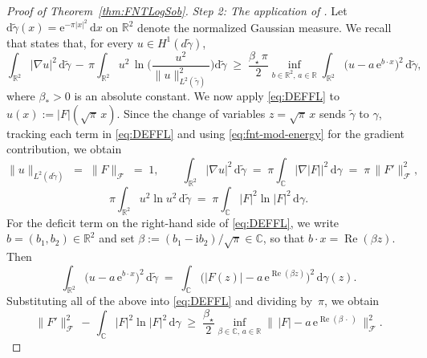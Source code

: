 \documentclass[11pt]{amsart}
\theoremstyle{remark}
\newcommand{\C}{\mathbb{C}}
\newcommand{\abs}[1]{\lvert #1 \rvert}
\newcommand{\norm}[1]{\lVert #1 \rVert}
\newcommand{\dd}{\mathrm{d}}
\newcommand{\ee}{\mathrm{e}}
\newcommand{\ii}{\mathrm{i}}
\begin{document}
\begin{proof}[Proof of Theorem~\ref{thm:FNTLogSob}]
\noindent
\emph{Step 2: The application of \cite[Corollary~1.2]{DolbeaultEstebanFigalliFrankLoss2025}.}\;
Let $\dd\widetilde{\gamma}(x) = \ee^{-\pi \abs{x}^2}\,\dd x$
on $\mathbb{R}^2$ denote the normalized 
Gaussian measure. We recall that
\cite[Corollary~1.2]{DolbeaultEstebanFigalliFrankLoss2025} states that, for
every $u \in H^1(d\widetilde{\gamma})$,
\begin{equation}\label{eq:DEFFL}
\int_{\mathbb{R}^2} \abs{\nabla u}^2\, \dd\widetilde{\gamma}
\,-\, \pi \int_{\mathbb{R}^2} u^2\, \ln\!\biggl(\frac{u^2}{\norm{u}_{L^2(\widetilde{\gamma})}^2}\biggr) \dd\widetilde{\gamma}
\;\ge\;
\frac{\beta_\star\, \pi}{2}
\inf_{b \in \mathbb{R}^2,\, a \in \mathbb{R}}
\int_{\mathbb{R}^2} \bigl(u - a\, \ee^{b\cdot x}\bigr)^2\, \dd\widetilde{\gamma},
\end{equation}
where $\beta_* > 0$ is an absolute constant. We now apply
\eqref{eq:DEFFL} to $u(x) := \abs{F}(\sqrt{\pi}\, x)$.  Since the change of 
variables $z = \sqrt{\pi}\, x$ sends $\tilde{\gamma}$ to $\gamma$, tracking
each term in \eqref{eq:DEFFL} and using \eqref{eq:fnt-mod-energy} for the gradient contribution, we obtain
\[
\norm{u}_{L^2(d\widetilde{\gamma})}
\;=\; \norm{F}_{\mathcal{F}} \;=\; 1,
\qquad
\int_{\mathbb{R}^2} \abs{\nabla u}^2\, \dd\widetilde{\gamma}
\;=\; \pi \int_{\C} \abs{\nabla \abs{F}}^2\, \dd\gamma
\;=\; \pi\, \norm{F'}_{\mathcal{F}}^2,
\]
\[
\pi \int_{\mathbb{R}^2} u^2 \ln u^2\, \dd\widetilde{\gamma}
\;=\; \pi \int_{\C} \abs{F}^2 \ln \abs{F}^2\, \dd\gamma.
\]
For the deficit term on the right-hand side of \eqref{eq:DEFFL}, we write
$b = (b_1, b_2) \in \mathbb{R}^2$ and set
$\beta := (b_1 - \ii b_2) / \sqrt{\pi} \in \C$, so that
$b\cdot x = \operatorname{Re}(\beta z)$. Then
\[
\int_{\mathbb{R}^2} \bigl(u - a\, \ee^{b\cdot x}\bigr)^2\, \dd\widetilde{\gamma}
\;=\;
\int_{\C} \bigl(\abs{F(z)} - a\, \ee^{\operatorname{Re}(\beta z)}\bigr)^2\, \dd\gamma(z).
\]
Substituting all of the above into \eqref{eq:DEFFL} and dividing by~$\pi$, we obtain
\begin{equation}\label{eq:fnt-DEFFL-applied}
\norm{F'}_{\mathcal{F}}^2
\,-\, \int_{\C} \abs{F}^2 \ln \abs{F}^2\, \dd\gamma
\;\ge\;
\frac{\beta_\star}{2}
\inf_{\beta \in \C,\, a \in \mathbb{R}}
\norm{\, \abs{F} - a\, \ee^{\operatorname{Re}(\beta\,\cdot\,)} \,}_{\mathcal{F}}^2.
\end{equation}
 


\end{proof}
\end{document}
